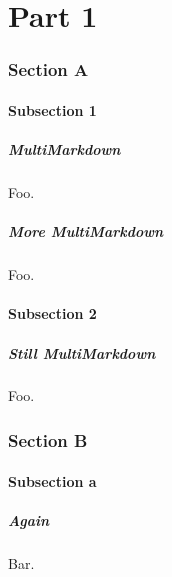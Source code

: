 \documentclass[ignorenonframetext,12pt,aspectratio=169]{beamer}
\subtitle{\mysubtitle}
\institute{\affiliation}
\date{\mydate}
\date[\mydate]{\mydate~ / \event }
\title[\mytitle\hspace{2em}\insertframenumber/
\inserttotalframenumber]{\mytitle}
\author{\myauthor}
\begin{document}
\maketitle

\part{Part 1}
\label{part1}

\section{Section A}
\label{sectiona}

\subsection{Subsection 1}
\label{subsection1}

\begin{frame}[fragile]
\frametitle{MultiMarkdown}
\label{multimarkdown}

Foo.

\end{frame}

\begin{frame}[fragile]
\frametitle{More MultiMarkdown}
\label{moremultimarkdown}

Foo.

\end{frame}

\subsection{Subsection 2}
\label{subsection2}

\begin{frame}[fragile]
\frametitle{Still MultiMarkdown}
\label{stillmultimarkdown}

Foo.

\end{frame}

\section{Section B}
\label{sectionb}

\subsection{Subsection a}
\label{subsectiona}

\begin{frame}[fragile]
\frametitle{Again}
\label{again}

Bar.

\end{frame}
\end{document}

